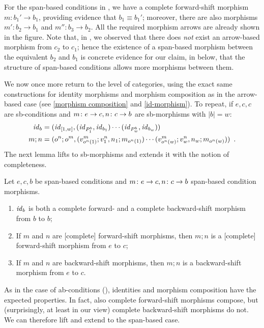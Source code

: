 %
\begin{example}
For the span-based conditions in , we have a complete forward-shift morphism $m:b_1'\to b_1$, providing evidence that $b_1\equiv b_1'$; moreover, there are also morphisms $m':b_2\to b_1$ and $m'':b_3\to b_2$. All the required morphism arrows are already shown in the figure. Note that, in , we observed that there does \emph{not} exist an arrow-based morphism from $c_2$ to $c_1$; hence the existence of a span-based morphism between the equivalent $b_2$ and $b_1$ is concrete evidence for our claim, in  below, that the structure of span-based conditions allows more morphisms between them.
\end{example}
%
We now once more return to the level of categories, using the exact same constructions for identity morphisms and morphism composition as in the arrow-based case (see \eqref{morphism composition} and \eqref{id-morphism}).
\iffull
To repeat, if $e,c,c$ are sb-conditions and $m\colon e\rightarrow c,n\colon c\rightarrow b$ are sb-morphisms with $|b|=w$:
%
\begin{align*}
\mathit{id}_b & = (\mathit{id}_{[1,w]},(\mathit{id}_{P^b_1},\mathit{id}_{b_1})\cdots
                       (\mathit{id}_{P^b_w},\mathit{id}_{b_w})) \\
m;n & =
   (o^n;o^m,(v^m_{o^n(1)};v^n_1,n_1;m_{o^n(1)})\cdots 
              (v^m_{o^n(w)};v^n_w,n_w;m_{o^n(w)}))
\enspace.
\end{align*}
%
The next lemma lifts  to sb-morphisms and extends it with the notion of completeness.

\begin{lemma}
Let $e,c,b$ be span-based conditions and $m\colon e\rightarrow c,n\colon c\rightarrow b$ span-based condition morphisms.
\begin{enumerate}[topsep=\smallskipamount]
\item $\mathit{id}_b$ is both a complete forward- and a complete backward-shift morphism from $b$ to $b$;
\item If $m$ and $n$ are [complete] forward-shift morphisms, then $m;n$ is a [complete] forward-shift morphism from $e$ to $c$;
\item If $m$ and $n$ are backward-shift morphisms, then $m;n$ is a backward-shift morphism from $e$ to $c$.
\end{enumerate}
\end{lemma}
\else
As in the case of ab-conditions (), identities and morphism composition have the expected properties. In fact, also complete forward-shift morphisms compose, but (surprisingly, at least in our view) complete backward-shift morphisms do not.
\fi
We can therefore lift and extend  to the span-based case.


